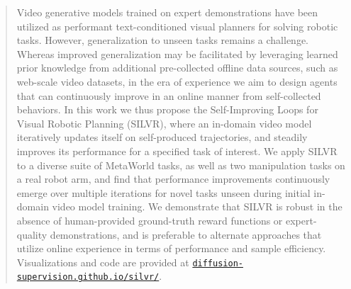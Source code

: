 \vspace{-0.65em}
\begin{abstract}
\vspace{-0.25em}
Video generative models trained on expert demonstrations have been utilized as performant text-conditioned visual planners for solving robotic tasks. However, generalization to unseen tasks remains a challenge. Whereas improved generalization may be facilitated by leveraging learned prior knowledge from additional pre-collected offline data sources, such as web-scale video datasets, in the era of experience we aim to design agents that can continuously improve in an online manner from self-collected behaviors.  In this work we thus propose the Self-Improving Loops for Visual Robotic Planning (SILVR), where an in-domain video model iteratively updates itself on self-produced trajectories, and steadily improves its performance for a specified task of interest.  We apply SILVR to a diverse suite of MetaWorld tasks, as well as two manipulation tasks on a real robot arm, and find that performance improvements continuously emerge over multiple iterations for novel tasks unseen during initial in-domain video model training.  We demonstrate that SILVR is robust in the absence of human-provided ground-truth reward functions or expert-quality demonstrations, and is preferable to alternate approaches that utilize online experience in terms of performance and sample efficiency. Visualizations and code are provided at \href{https://diffusion-supervision.github.io/silvr/}{\nolinkurl{diffusion-supervision.github.io/silvr/}}.
\end{abstract}
